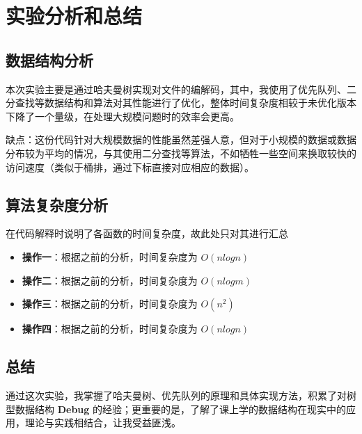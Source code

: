 \section{实验分析和总结}
    \subsection{数据结构分析}
        \par 本次实验主要是通过哈夫曼树实现对文件的编解码，其中，我使用了优先队列、二分查找等数据结构和算法对其性能进行了优化，整体时间复杂度相较于未优化版本下降了一个量级，在处理大规模问题时的效率会更高。
        \par 缺点：这份代码针对大规模数据的性能虽然差强人意，但对于小规模的数据或数据分布较为平均的情况，与其使用二分查找等算法，不如牺牲一些空间来换取较快的访问速度（类似于桶排，通过下标直接对应相应的数据）。
    \subsection{算法复杂度分析}
        \par 在代码解释时说明了各函数的时间复杂度，故此处只对其进行汇总
        \begin{itemize}
            \item \textbf{操作一}：根据之前的分析，时间复杂度为 $O(nlogn)$
            \item \textbf{操作二}：根据之前的分析，时间复杂度为 $O(nlogm)$
            \item \textbf{操作三}：根据之前的分析，时间复杂度为 $O(n^2)$
            \item \textbf{操作四}：根据之前的分析，时间复杂度为 $O(nlogn)$
        \end{itemize}
    \subsection{总结}
        \par 通过这次实验，我掌握了哈夫曼树、优先队列的原理和具体实现方法，积累了对树型数据结构 \textbf{Debug} 的经验；更重要的是，了解了课上学的数据结构在现实中的应用，理论与实践相结合，让我受益匪浅。
